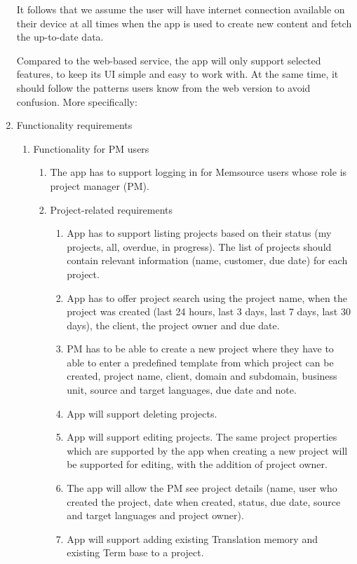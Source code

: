 \begin{enumerate}
	It follows that we assume the user will have internet connection available on their device at all times when the app is used to create new content and fetch the up-to-date data. 
	
	Compared to the web-based service, the app will only support selected features, to keep its UI simple and easy to work with. At the same time, it should follow the patterns users know from the web version to avoid confusion. More specifically: 
	
	\item Functionality requirements
	\begin{enumerate}[label*=\arabic*.]
		\item Functionality for PM users 
		
		\begin{enumerate}[label*=\arabic*.]
			\item The app has to support logging in for Memsource users whose role is project manager (PM).
			
			\item Project-related requirements
			\begin{enumerate}[label*=\arabic*.]
				\item App has to support listing projects based on their status (my projects, all, overdue, in progress). The list of projects should contain relevant information (name, customer, due date) for each project.
				\item App has to offer project search using the project name, when the project was created (last 24 hours, last 3 days, last 7 days, last 30 days), the client, the project owner and due date.
				\item PM has to be able to create a new project where they have to able to enter a predefined template from which project can be created, project name, client, domain and subdomain, business unit, source and target languages, due date and note.
				\item App will support deleting projects.
				\item App will support editing projects. The same project properties which are supported by the app when creating a new project will be supported for editing, with the addition of project owner.
				\item The app will allow the PM see project details (name, user who created the project, date when created, status, due date, source and target languages and project owner).
				\item App will support adding existing Translation memory and existing Term base to a project.
			\end{enumerate}
			

\end{enumerate}
\end{enumerate}
\end{enumerate}
